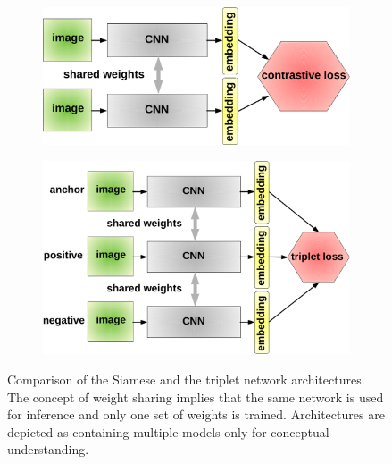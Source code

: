 \begin{figure}[t]
    \centering
    \begin{subfigure}[b]{0.49\textwidth}
        \centering
        \includegraphics[width=\textwidth]{figures/theoretical_foundations/siamese_architecture.pdf}
        \caption[]{}
    \end{subfigure}
    \hfill
    \begin{subfigure}[b]{0.49\textwidth}
        \centering
        \includegraphics[width=\textwidth]{figures/theoretical_foundations/triplet_architecture.pdf}
        \caption[]{}
    \end{subfigure}
    \caption[Contrastive and triplet loss]{Comparison of the Siamese  and the triplet  network architectures. The concept of weight sharing implies that the same network is used for inference and only one set of weights is trained. Architectures are depicted as containing multiple models only for conceptual understanding.}
    \label{fig:SiameseAndTripletArchitectures}
\end{figure}

